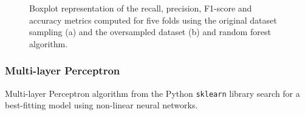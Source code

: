\begin{figure}[H]
\centering
  \qquad
\caption{Boxplot representation of the recall, precision, F1-score and accuracy metrics computed for five folds using the original dataset sampling (a) and the oversampled dataset (b) and random forest algorithm.}
\label{figure_metrics_RF}
\end{figure}

\subsubsection{Multi-layer Perceptron}
Multi-layer Perceptron algorithm from the Python \texttt{sklearn} library search for a best-fitting 
model using non-linear neural networks.\\

